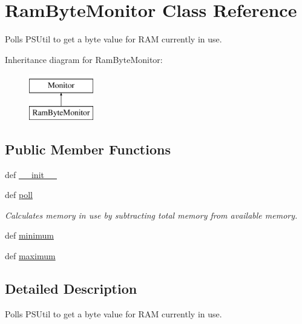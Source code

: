 \hypertarget{classsrc_1_1client_1_1_ram_byte_monitor_1_1_ram_byte_monitor}{\section{Ram\-Byte\-Monitor Class Reference}
\label{classsrc_1_1client_1_1_ram_byte_monitor_1_1_ram_byte_monitor}
}


Polls P\-S\-Util to get a byte value for R\-A\-M currently in use.  


Inheritance diagram for Ram\-Byte\-Monitor\-:\begin{figure}[H]
\begin{center}
\leavevmode
\includegraphics[height=2.000000cm]{classsrc_1_1client_1_1_ram_byte_monitor_1_1_ram_byte_monitor}
\end{center}
\end{figure}
\subsection*{Public Member Functions}
\begin{DoxyCompactItemize}
\item 
def \hyperlink{classsrc_1_1client_1_1_ram_byte_monitor_1_1_ram_byte_monitor_ac775ee34451fdfa742b318538164070e}{\-\_\-\-\_\-init\-\_\-\-\_\-}
\item 
def \hyperlink{classsrc_1_1client_1_1_ram_byte_monitor_1_1_ram_byte_monitor_a87cd0076a6d482a01482f25a64cf2fb4}{poll}
\begin{DoxyCompactList}\small\item\em Calculates memory in use by subtracting total memory from available memory. \end{DoxyCompactList}\item 
def \hyperlink{classsrc_1_1client_1_1_ram_byte_monitor_1_1_ram_byte_monitor_a4515aa6e0be4391413959391fef1109f}{minimum}
\item 
def \hyperlink{classsrc_1_1client_1_1_ram_byte_monitor_1_1_ram_byte_monitor_a8f6589fdc9d322ec8e0dc2c7ede55ce9}{maximum}
\end{DoxyCompactItemize}


\subsection{Detailed Description}
Polls P\-S\-Util to get a byte value for R\-A\-M currently in use. 

